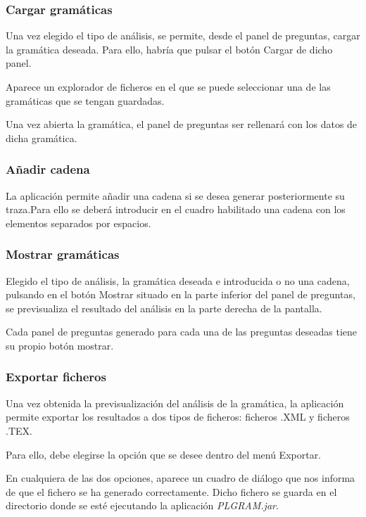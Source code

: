 \subsubsection{Cargar gramáticas}
Una vez elegido el tipo de análisis, se permite, desde el panel de preguntas, cargar la gramática deseada. Para ello, habría que pulsar el botón Cargar de dicho panel.

Aparece un explorador de ficheros en el que se puede seleccionar una de las gramáticas que se tengan guardadas.

Una vez abierta la gramática, el panel de preguntas ser rellenará con los datos de dicha gramática.
\newpage
\subsubsection{Añadir cadena}
La aplicación permite añadir una cadena si se desea generar posteriormente su traza.Para ello se deberá introducir en el cuadro habilitado una cadena con los elementos separados por espacios. 

\newpage
\subsubsection{Mostrar gramáticas}
Elegido el tipo de análisis, la gramática deseada e introducida o no una cadena, pulsando en el botón Mostrar situado en la parte inferior del panel de preguntas, se previsualiza el resultado del análisis en la parte derecha de la pantalla.

Cada panel de preguntas generado para cada una de las preguntas deseadas tiene su propio botón mostrar. 
\newpage
\subsubsection{Exportar ficheros}
Una vez obtenida la previsualización del análisis de la gramática, la aplicación permite exportar los resultados a dos tipos de ficheros: ficheros .XML y ficheros .TEX.

Para ello, debe elegirse la opción que se desee dentro del menú Exportar.

En cualquiera de las dos opciones, aparece un cuadro de diálogo que nos informa de que el fichero se ha generado correctamente. Dicho fichero se guarda en el directorio donde se esté ejecutando la aplicación \textit{PLGRAM.jar}.
\newpage
